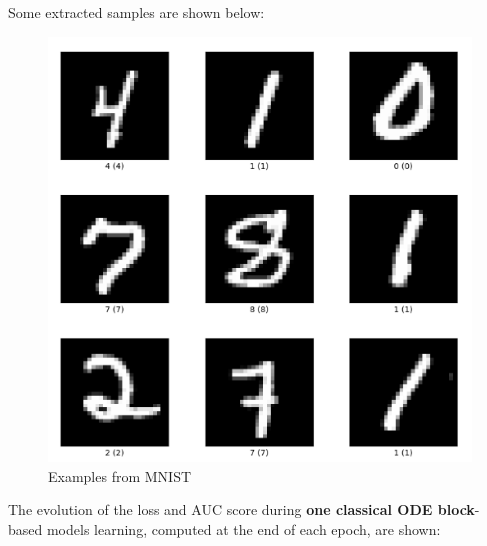 \documentclass[12pt,a4paper]{report}
\begin{document}
Some extracted samples are shown below:

\begin{figure}[th]
  \centering
  \includegraphics[scale=0.65]{./pics/mnist.png}
  \caption[Examples from MNIST]{Examples from MNIST\protect\footnotemark}
  \label{fig:p14}
\end{figure}

The evolution of the loss and AUC score during \textbf{one classical ODE block}-based models learning, computed at the end of each epoch, are shown:
\end{document}
